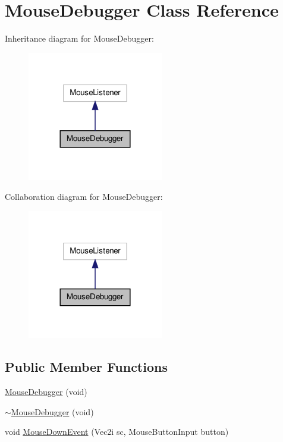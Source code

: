 \hypertarget{class_mouse_debugger}{\section{Mouse\-Debugger Class Reference}
\label{class_mouse_debugger}
}


Inheritance diagram for Mouse\-Debugger\-:
\nopagebreak
\begin{figure}[H]
\begin{center}
\leavevmode
\includegraphics[width=168pt]{class_mouse_debugger__inherit__graph}
\end{center}
\end{figure}


Collaboration diagram for Mouse\-Debugger\-:
\nopagebreak
\begin{figure}[H]
\begin{center}
\leavevmode
\includegraphics[width=168pt]{class_mouse_debugger__coll__graph}
\end{center}
\end{figure}
\subsection*{Public Member Functions}
\begin{DoxyCompactItemize}
\item 
\hyperlink{class_mouse_debugger_ad412f746c7415c334d346f40ba4c9a05}{Mouse\-Debugger} (void)
\item 
\hyperlink{class_mouse_debugger_a6b60c23ad59db3df59e3fefcacde9042}{$\sim$\-Mouse\-Debugger} (void)
\item 
void \hyperlink{class_mouse_debugger_a0d7f7e10a54cd1fc98370467805b24ac}{Mouse\-Down\-Event} (Vec2i sc, Mouse\-Button\-Input button)
\end{DoxyCompactItemize}


